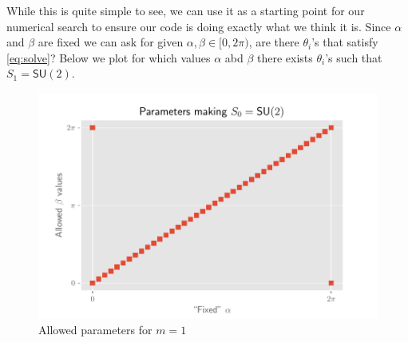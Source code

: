 \documentclass[12pt,dvipsnames]{article}
\newcommand{\SU}[1]{\mathsf{SU} (#1)}
\newcommand{\1}{\mathbb{1}}
\theoremstyle{plain}
\begin{document}
While this is quite simple to see, we can use it as a starting point for our numerical search to ensure our code is doing exactly what we think it is. Since $\alpha$ and $\beta$ are fixed we can ask for given $\alpha, \beta\in[0, 2\pi)$, are there $\theta_i$'s that satisfy \cref{eq:solve}? Below we plot for which values $\alpha$ abd $\beta$ there exists $\theta_i$'s such that $S_1 = \SU{2}$. %
\begin{figure}[h]
    \begin{minipage}[c]{0.7\textwidth}
        \includegraphics[width=\textwidth]{../su2/s0.pdf}
    \end{minipage}\hfill
    \begin{minipage}[c]{0.3\textwidth}
        \caption{Allowed parameters for $m = 1$}\label{fig:m=1}
    \end{minipage}
\end{figure}
\end{document}
